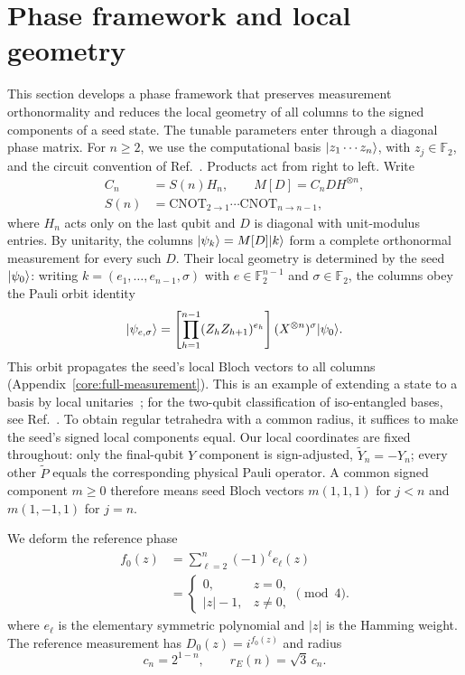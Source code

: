 \section{Phase framework and local geometry}
\label{core:framework}

This section develops a phase framework that preserves measurement orthonormality and reduces the local geometry of all columns to the signed components of a seed state. The tunable parameters enter through a diagonal phase matrix. For $n\ge2$, we use the computational basis $\lvert z_1\cdots z_n\rangle$, with $z_j\in\mathbb F_2$, and the circuit convention of Ref.~\cite{PauwelsGisin2026}. Products act from right to left. Write
\begin{align}
 C_n&=S(n)H_n,\qquad M[D]=C_nDH^{\otimes n},\nonumber\\
 S(n)&=\mathrm{CNOT}_{2\to1}\cdots\mathrm{CNOT}_{n\to n-1},
 \label{core:phase-family}
\end{align}
where $H_n$ acts only on the last qubit and $D$ is diagonal with unit-modulus entries. By unitarity, the columns $\lvert \psi_k\rangle=M[D]\lvert k\rangle$ form a complete orthonormal measurement for every such $D$. Their local geometry is determined by the seed $\lvert \psi_0\rangle$: writing $k=(e_1,\ldots,e_{n-1},\sigma)$ with $e\in\mathbb F_2^{n-1}$ and $\sigma\in\mathbb F_2$, the columns obey the Pauli orbit identity
\begin{equation}
 \lvert \psi_{e,\sigma}\rangle=
 \left[\prod_{h=1}^{n-1}(Z_hZ_{h+1})^{e_h}\right]
 (X^{\otimes n})^\sigma\lvert \psi_0\rangle.
 \label{core:orbit}
\end{equation}
This orbit propagates the seed's local Bloch vectors to all columns (Appendix~\ref{core:full-measurement}). This is an example of extending a state to a basis by local unitaries~\cite{Pimpel2023}; for the two-qubit classification of iso-entangled bases, see Ref.~\cite{DelSanto2024}. To obtain regular tetrahedra with a common radius, it suffices to make the seed's signed local components equal. Our local coordinates are fixed throughout: only the final-qubit $Y$ component is sign-adjusted, $\widetilde Y_n=-Y_n$; every other $\widetilde P$ equals the corresponding physical Pauli operator. A common signed component $m\ge0$ therefore means seed Bloch vectors $m(1,1,1)$ for $j<n$ and $m(1,-1,1)$ for $j=n$.

We deform the reference phase
\begin{equation}
 \begin{aligned}
 f_0(z)&=\sum_{\ell=2}^n(-1)^\ell e_\ell(z)\\
 &=\begin{cases}0,&z=0,\\ |z|-1,&z\ne0,\end{cases}\pmod4.
 \end{aligned}
 \label{core:reference-phase}
\end{equation}
where $e_\ell$ is the elementary symmetric polynomial and $|z|$ is the Hamming weight. The reference measurement has $D_0(z)=i^{f_0(z)}$ and radius
\begin{equation}
 c_n=2^{1-n},\qquad r_E(n)=\sqrt3\,c_n.
 \label{core:reference-radius}
\end{equation}

